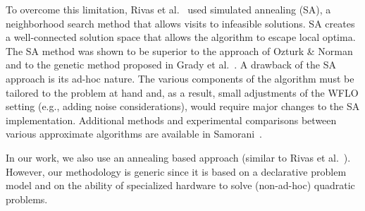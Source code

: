 \documentclass[preprint,12pt]{elsarticle}
\newcommand{\todo}[1]{{\textcolor{red}{\bf {#1}}}}
\begin{document}
To overcome this limitation, Rivas et al.\ \cite{rivas2009solving} used simulated annealing (SA), 
a neighborhood search method that allows visits to infeasible solutions. 
SA creates a well-connected solution space that allows the algorithm to escape 
local optima. The SA method was shown to be superior to the approach of Ozturk \& Norman~\cite{ozturk2004heuristic} 
and to the genetic method proposed in Grady et al.\ \cite{grady2005placement}. A drawback of the SA approach 
is its ad-hoc nature. The various components of the algorithm
 must be tailored to the problem at hand and, as a result, small adjustments of the WFLO setting
 (e.g., adding noise considerations), would require major changes to the SA implementation. 
Additional methods and experimental comparisons between various approximate algorithms are available in Samorani~\cite{samorani2013wind}.

In our work, we also use an annealing based approach (similar to Rivas et al.\ \cite{rivas2009solving}). However,
our methodology is generic since it is based on a declarative problem model and
on the ability of specialized hardware to solve (non-ad-hoc) quadratic problems.




%
%
%
%
%
%
\end{document}
